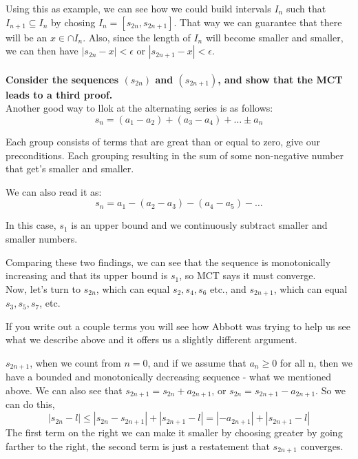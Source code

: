 Using this as example, we can see how we could build intervals $I_n$ such that $I_{n+1} \subseteq I_n$
by chosing $I_n = [s_{2n}, s_{2n+1}]$.
That way we can guarantee that there will be an $x\in\cap I_n$.
Also, since the length of $I_n$ will become smaller and smaller, we can then have
$|s_{2n} - x| < \epsilon$ or $|s_{2n+1} - x| < \epsilon$.
\\~\\


\textbf{Consider the sequences $(s_{2n})$ and $(s_{2n+1})$, and show that the MCT leads to a third proof.}
\\

Another good way to llok at the alternating series is as follows:
$$
s_n = (a_1 - a_2) + (a_3 - a_4) + \ldots \pm a_n
$$

Each group consists of terms that are great than or equal to zero, give our preconditions.
Each grouping resulting in the sum of some non-negative number that get's smaller and smaller.

We can also read it as:
$$
s_n = a_1 - (a_2 - a_3) - (a_4 - a_5) - \ldots
$$

In this case, $s_1$ is an upper bound and we continuously subtract smaller and smaller numbers.

Comparing these two findings, we can see that the sequence is monotonically increasing and that its
upper bound is $s_1$, so MCT says it must converge.
\\

Now, let's turn to $s_{2n}$, which can equal $s_2, s_4, s_6$ etc.,
and $s_{2n+1}$, which can equal $s_3, s_5, s_7$, etc.

If you write out a couple terms you will see how Abbott was trying to help us see what we describe above
and it offers us a slightly different argument.

$s_{2n+1}$, when we count from $n=0$, and if we assume that $a_n \geq 0$ for all n,
then we have a bounded and monotonically decreasing sequence - what we mentioned above.
We can also see that $s_{2n+1} = s_{2n} + a_{2n+1}$, or $s_{2n} = s_{2n+1} - a_{2n+1}$.
So we can do this,
$$
|s_{2n} - l| \leq |s_{2n} - s_{2n+1}| + |s_{2n+1} - l|
= |-a_{2n+1}| + |s_{2n+1} - l|
$$
The first term on the right we can make it smaller by choosing greater by going farther to the right,
the second term is just a restatement that $s_{2n+1}$ converges.
\\~\\




